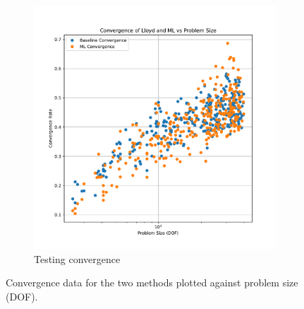\documentclass{article}
\begin{document}
\begin{figure}[h]
\begin{subfigure}[t]{0.49\textwidth}
    \includegraphics[width=\textwidth]{iso_test_convergence_per_size.pdf}
    \caption{Testing convergence}
  \end{subfigure}
  \caption{Convergence data for the two methods plotted against problem size (DOF).}
  \label{fig:conv_per_size}
\end{figure}
\end{document}
